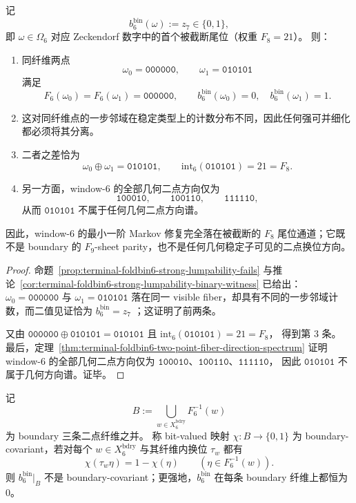 \begin{theorem}\label{thm:window6-minimal-markov-obstruction-pure-f8-tail}
记
\[
b^{\mathrm{bin}}_6(\omega):=z_7\in\{0,1\},
\]
即 \(\omega\in\Omega_6\) 对应 Zeckendorf 数字中的首个被截断尾位（权重 \(F_8=21\)）。
则：
\begin{enumerate}
  \item 同纤维两点
  \[
  \omega_0=\texttt{000000},\qquad
  \omega_1=\texttt{010101}
  \]
  满足
  \[
  F_6(\omega_0)=F_6(\omega_1)=\texttt{000000},
  \qquad
  b^{\mathrm{bin}}_6(\omega_0)=0,\quad
  b^{\mathrm{bin}}_6(\omega_1)=1.
  \]
  \item 这对同纤维点的一步邻域在稳定类型上的计数分布不同，因此任何强可并细化都必须将其分离。
  \item 二者之差恰为
  \[
  \omega_0\oplus\omega_1=\texttt{010101},
  \qquad
  \mathrm{int}_6(\texttt{010101})=21=F_8.
  \]
  \item 另一方面，window-\(6\) 的全部几何二点方向仅为
  \[
  \texttt{100010},\qquad \texttt{100110},\qquad \texttt{111110},
  \]
  从而 \(\texttt{010101}\) 不属于任何几何二点方向谱。
\end{enumerate}
因此，window-\(6\) 的最小一阶 Markov 修复完全落在被截断的 \(F_8\) 尾位通道；它既不是 boundary 的 \(F_9\)-sheet parity，也不是任何几何稳定子可见的二点换位方向。
\end{theorem}

\begin{proof}
命题~\ref{prop:terminal-foldbin6-strong-lumpability-fails} 与推论~\ref{cor:terminal-foldbin6-strong-lumpability-binary-witness} 已给出：\(\omega_0=\texttt{000000}\) 与 \(\omega_1=\texttt{010101}\) 落在同一 visible fiber，却具有不同的一步邻域计数，而二值见证恰为
\(
b^{\mathrm{bin}}_6=z_7
\)
；这证明了前两条。

又由
\(
\texttt{000000}\oplus\texttt{010101}=\texttt{010101}
\)
且
\(
\mathrm{int}_6(\texttt{010101})=21=F_8
\)，
得到第 \(3\) 条。
最后，定理~\ref{thm:terminal-foldbin6-two-point-fiber-direction-spectrum} 证明 window-\(6\) 的全部几何二点方向仅为
\(\texttt{100010}\)、\(\texttt{100110}\)、\(\texttt{111110}\)，
因此 \(\texttt{010101}\) 不属于几何方向谱。证毕。
\end{proof}

\begin{theorem}\label{thm:window6-f8-repair-bit-no-boundary-covariant-extension}
记
\[
B:=\bigcup_{w\in X_6^{\mathrm{bdry}}}F_6^{-1}(w)
\]
为 boundary 三条二点纤维之并。
称 bit-valued 映射 \(\chi:B\to\{0,1\}\) 为 boundary-covariant，若对每个 \(w\in X_6^{\mathrm{bdry}}\) 与其纤维内换位 \(\tau_w\) 都有
\[
\chi(\tau_w\eta)=1-\chi(\eta)\qquad(\eta\in F_6^{-1}(w)).
\]
则 \(b^{\mathrm{bin}}_6|_B\) 不是 boundary-covariant；更强地，\(b^{\mathrm{bin}}_6\) 在每条 boundary 纤维上都恒为 \(0\)。
\end{theorem}

